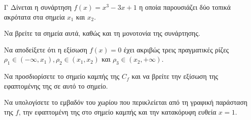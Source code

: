 \begin{thema}{Γ}
Δίνεται η συνάρτηση $f(x) = x^3 - 3x + 1$ η οποία παρουσιάζει δύο τοπικά ακρότατα στα σημεία $x_1$ και $x_2$.
\begin{erwthma}
  \item Να βρείτε τα σημεία αυτά, καθώς και τη μονοτονία της συνάρτησης.
  \item Να αποδείξετε ότι η εξίσωση $f(x) = 0$ έχει ακριβώς τρεις πραγματικές ρίζες $\rho_1 \in (-\infty, x_1), \rho_2 \in (x_1, x_2)$ και $\rho_3 \in (x_2, +\infty)$.
  \item Να προσδιορίσετε το σημείο καμπής της $C_f$ και να βρείτε την εξίσωση της εφαπτομένης της σε αυτό το σημείο.
  \item Να υπολογίσετε το εμβαδόν του χωρίου που περικλείεται από τη γραφική παράσταση της $f$, την εφαπτομένη της στο σημείο καμπής και την κατακόρυφη ευθεία $x = 1$.
\end{erwthma}
\end{thema}
